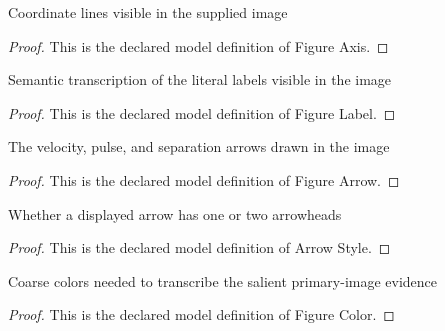 \begin{definition}
  \label{def:physics:phyx-mini-0528:phyxminiproblems-problemphyxmini0528-figureaxis}
  Coordinate lines visible in the supplied image
\end{definition}
\begin{proof}
  This is the declared model definition of Figure Axis.
\end{proof}
\begin{definition}
  \label{def:physics:phyx-mini-0528:phyxminiproblems-problemphyxmini0528-figurelabel}
  Semantic transcription of the literal labels visible in the image
\end{definition}
\begin{proof}
  This is the declared model definition of Figure Label.
\end{proof}
\begin{definition}
  \label{def:physics:phyx-mini-0528:phyxminiproblems-problemphyxmini0528-figurearrow}
  The velocity, pulse, and separation arrows drawn in the image
\end{definition}
\begin{proof}
  This is the declared model definition of Figure Arrow.
\end{proof}
\begin{definition}
  \label{def:physics:phyx-mini-0528:phyxminiproblems-problemphyxmini0528-arrowstyle}
  Whether a displayed arrow has one or two arrowheads
\end{definition}
\begin{proof}
  This is the declared model definition of Arrow Style.
\end{proof}
\begin{definition}
  \label{def:physics:phyx-mini-0528:phyxminiproblems-problemphyxmini0528-figurecolor}
  Coarse colors needed to transcribe the salient primary-image evidence
\end{definition}
\begin{proof}
  This is the declared model definition of Figure Color.
\end{proof}
